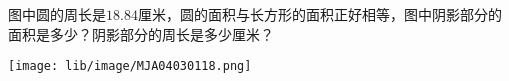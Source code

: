 图中圆的周长是$18.84$厘米，圆的面积与长方形的面积正好相等，图中阴影部分的面积是多少？阴影部分的周长是多少厘米？

\begin{center}
    \texttt{[image: lib/image/MJA04030118.png]}
\end{center}